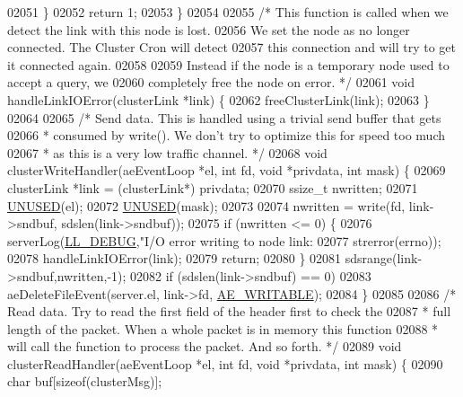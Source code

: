 \begin{DoxyCode}
{{{{{{{{{{{{{{{{{{{{{{{{{{{{{{{{{{{{02051     \}
02052     \textcolor{keywordflow}{return} 1;
02053 \}
02054 
02055 \textcolor{comment}{/* This function is called when we detect the link with this node is lost.}
02056 \textcolor{comment}{   We set the node as no longer connected. The Cluster Cron will detect}
02057 \textcolor{comment}{   this connection and will try to get it connected again.}
02058 \textcolor{comment}{}
02059 \textcolor{comment}{   Instead if the node is a temporary node used to accept a query, we}
02060 \textcolor{comment}{   completely free the node on error. */}
02061 \textcolor{keywordtype}{void} handleLinkIOError(clusterLink *link) \{
02062     freeClusterLink(link);
02063 \}
02064 
02065 \textcolor{comment}{/* Send data. This is handled using a trivial send buffer that gets}
02066 \textcolor{comment}{ * consumed by write(). We don't try to optimize this for speed too much}
02067 \textcolor{comment}{ * as this is a very low traffic channel. */}
02068 \textcolor{keywordtype}{void} clusterWriteHandler(aeEventLoop *el, \textcolor{keywordtype}{int} fd, \textcolor{keywordtype}{void} *privdata, \textcolor{keywordtype}{int} mask) \{
02069     clusterLink *link = (clusterLink*) privdata;
02070     ssize\_t nwritten;
02071     \hyperlink{server_8h_ae7c9dc8f13568a9c856573751f1ee1ec}{UNUSED}(el);
02072     \hyperlink{server_8h_ae7c9dc8f13568a9c856573751f1ee1ec}{UNUSED}(mask);
02073 
02074     nwritten = write(fd, link->sndbuf, sdslen(link->sndbuf));
02075     \textcolor{keywordflow}{if} (nwritten <= 0) \{
02076         serverLog(\hyperlink{server_8h_abcaffe365dee628fcf9fc90c69d534a1}{LL\_DEBUG},\textcolor{stringliteral}{"I/O error writing to node link: %
02077             strerror(errno));
02078         handleLinkIOError(link);
02079         \textcolor{keywordflow}{return};
02080     \}
02081     sdsrange(link->sndbuf,nwritten,-1);
02082     \textcolor{keywordflow}{if} (sdslen(link->sndbuf) == 0)
02083         aeDeleteFileEvent(server.el, link->fd, \hyperlink{ae_8h_ab6bfb0366ccb6277112d132c2a2bf500}{AE\_WRITABLE});
02084 \}
02085 
02086 \textcolor{comment}{/* Read data. Try to read the first field of the header first to check the}
02087 \textcolor{comment}{ * full length of the packet. When a whole packet is in memory this function}
02088 \textcolor{comment}{ * will call the function to process the packet. And so forth. */}
02089 \textcolor{keywordtype}{void} clusterReadHandler(aeEventLoop *el, \textcolor{keywordtype}{int} fd, \textcolor{keywordtype}{void} *privdata, \textcolor{keywordtype}{int} mask) \{
02090     \textcolor{keywordtype}{char} buf[\textcolor{keyword}{sizeof}(clusterMsg)];
}}}}}}}}}}}}}}}}}}}}}}}}}}}}}}}}}}}}}
\end{DoxyCode}
